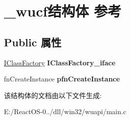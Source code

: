 \hypertarget{struct__wucf}{}\section{\+\_\+wucf结构体 参考}
\label{struct__wucf}
\subsection*{Public 属性}
\begin{DoxyCompactItemize}
\item 
\mbox{\label{struct__wucf_a429e64057e88594270a8ba7f10e18da5}} 
\hyperlink{interface_i_class_factory}{I\+Class\+Factory} {\bfseries I\+Class\+Factory\+\_\+iface}
\item 
\mbox{\label{struct__wucf_ae97b3dc5dd4fc81c63d21a3e28758a50}} 
fn\+Create\+Instance {\bfseries pfn\+Create\+Instance}
\end{DoxyCompactItemize}


该结构体的文档由以下文件生成\+:\begin{DoxyCompactItemize}
\item 
E\+:/\+React\+O\+S-\/0../dll/win32/wuapi/main.\+c\end{DoxyCompactItemize}
